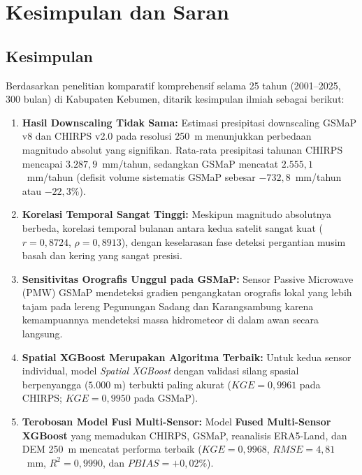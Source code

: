 \documentclass[11pt,a4paper,titlepage]{article}
\begin{document}
\section{Kesimpulan dan Saran}

\subsection{Kesimpulan}
Berdasarkan penelitian komparatif komprehensif selama 25 tahun (2001--2025, 300 bulan) di Kabupaten Kebumen, ditarik kesimpulan ilmiah sebagai berikut:
\begin{enumerate}
    \item \textbf{Hasil Downscaling Tidak Sama:} Estimasi presipitasi downscaling GSMaP v8 dan CHIRPS v2.0 pada resolusi 250~m menunjukkan perbedaan magnitudo absolut yang signifikan. Rata-rata presipitasi tahunan CHIRPS mencapai $3.287,9$~mm/tahun, sedangkan GSMaP mencatat $2.555,1$~mm/tahun (defisit volume sistematis GSMaP sebesar $-732,8$~mm/tahun atau $-22,3\%$).
    \item \textbf{Korelasi Temporal Sangat Tinggi:} Meskipun magnitudo absolutnya berbeda, korelasi temporal bulanan antara kedua satelit sangat kuat ($r = 0,8724$, $\rho = 0,8913$), dengan keselarasan fase deteksi pergantian musim basah dan kering yang sangat presisi.
    \item \textbf{Sensitivitas Orografis Unggul pada GSMaP:} Sensor Passive Microwave (PMW) GSMaP mendeteksi gradien pengangkatan orografis lokal yang lebih tajam pada lereng Pegunungan Sadang dan Karangsambung karena kemampuannya mendeteksi massa hidrometeor di dalam awan secara langsung.
    \item \textbf{Spatial XGBoost Merupakan Algoritma Terbaik:} Untuk kedua sensor individual, model \textit{Spatial XGBoost} dengan validasi silang spasial berpenyangga ($5.000\text{ m}$) terbukti paling akurat ($KGE = 0,9961$ pada CHIRPS; $KGE = 0,9950$ pada GSMaP).
    \item \textbf{Terobosan Model Fusi Multi-Sensor:} Model \textbf{Fused Multi-Sensor XGBoost} yang memadukan CHIRPS, GSMaP, reanalisis ERA5-Land, dan DEM 250~m mencatat performa terbaik ($KGE = 0,9968$, $RMSE = 4,81$~mm, $R^2 = 0,9990$, dan $PBIAS = +0,02\%$).
\end{enumerate}
\end{document}
